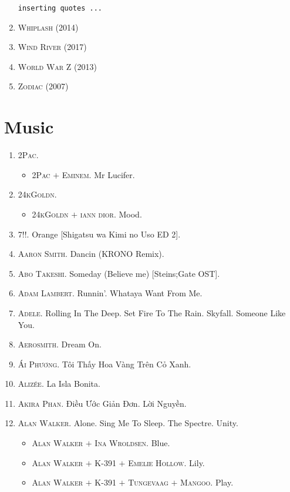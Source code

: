 \documentclass{article}
\begin{document}
\begin{enumerate}
	\texttt{inserting quotes ...}
	\item \textsc{Whiplash} (2014)
	\item \textsc{Wind River} (2017)
	\item \textsc{World War Z} (2013)
	\item \textsc{Zodiac} (2007)
\end{enumerate}


\section{Music}

\begin{enumerate}
	\item \textsc{2Pac.}
	\begin{itemize}
		\item \textsc{2Pac $+$ Eminem.} Mr Lucifer.
	\end{itemize}
	\item \textsc{24kGoldn.}
	\begin{itemize}
		\item \textsc{24kGoldn $+$ iann dior.} Mood.
	\end{itemize}
	\item \textsc{7!!.} Orange [Shigatsu wa Kimi no Uso ED 2].
	\item \textsc{Aaron Smith.} Dancin (KRONO Remix).
	\item \textsc{Abo Takeshi.} Someday (Believe me) [Steins;Gate OST].
	\item \textsc{Adam Lambert.} Runnin'. Whataya Want From Me.
	\item \textsc{Adele.} Rolling In The Deep. Set Fire To The Rain. Skyfall. Someone Like You.
	\item \textsc{Aerosmith.} Dream On.
	\item \textsc{Ái Phương.} Tôi Thấy Hoa Vàng Trên Cỏ Xanh.
	\item \textsc{Alizée.} La Isla Bonita.
	\item \textsc{Akira Phan.} Điều Ước Giản Đơn. Lời Nguyền.
	\item \textsc{Alan Walker.} Alone. Sing Me To Sleep. The Spectre. Unity.
	\begin{itemize}
		\item \textsc{Alan Walker $+$ Ina Wroldsen.} Blue.
		\item \textsc{Alan Walker $+$ K-391 $+$ Emelie Hollow.} Lily.
		\item \textsc{Alan Walker $+$ K-391 $+$ Tungevaag $+$ Mangoo.} Play.

\end{itemize}
\end{enumerate}
\end{document}
